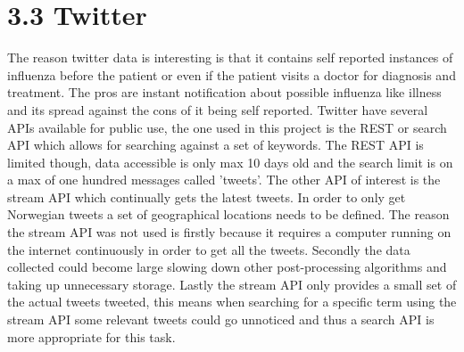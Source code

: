 \section*{3.3 Twitter}
The reason twitter data is interesting is that it contains self reported instances of influenza before the patient or even if the patient visits a doctor for diagnosis and treatment. The pros are instant notification about possible influenza like illness and its spread against the cons of it being self reported. Twitter have several APIs available for public use, the one used in this project is the REST or search API which allows for searching against a set of keywords. The REST API is limited though, data accessible is only max 10 days old and the search limit is on a max of one hundred messages called 'tweets'. The other API of interest is the stream API which continually gets the latest tweets. In order to only get Norwegian tweets a set of geographical locations needs to be defined. The reason the stream API was not used is firstly because it requires a computer running on the internet continuously in order to get all the tweets. Secondly the data collected could become large slowing down other post-processing algorithms and taking up unnecessary storage. Lastly the stream API only provides a small set of the actual tweets tweeted, this means when searching for a specific term using the stream API some relevant tweets could go unnoticed and thus a search API is more appropriate for this task.